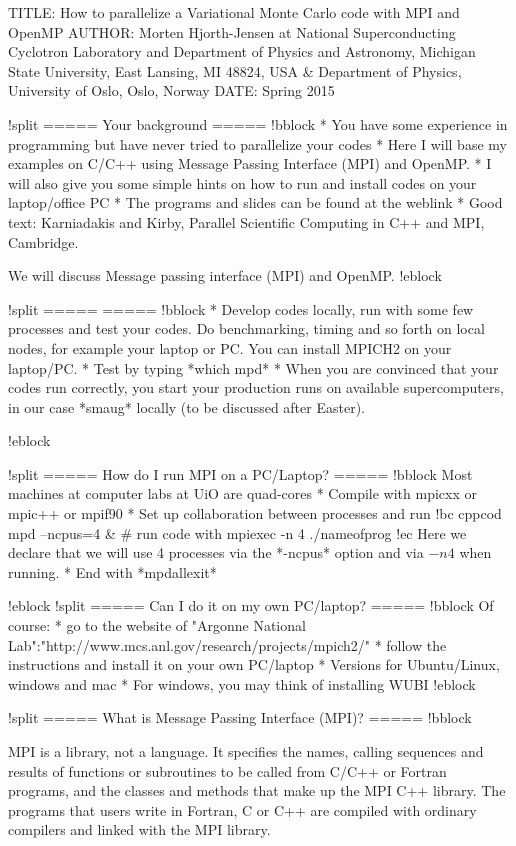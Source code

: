 TITLE: How to parallelize a Variational Monte Carlo code with MPI and OpenMP
AUTHOR: Morten Hjorth-Jensen at  National Superconducting Cyclotron Laboratory and Department of Physics and Astronomy, Michigan State University, East Lansing, MI 48824, USA & Department of Physics, University of Oslo, Oslo, Norway
DATE: Spring 2015


!split
===== Your background  =====
!bblock
* You have some experience in programming but have never tried to parallelize your codes
* Here I will base my examples on C/C++ using Message Passing Interface (MPI) and OpenMP. 
* I will also give you some simple hints on how to run and install codes on your laptop/office PC
* The programs and slides can be found at the weblink
* Good text: Karniadakis and Kirby, Parallel Scientific Computing in C++ and MPI, Cambridge.

We will discuss Message passing interface (MPI) and OpenMP.
!eblock

!split
=====  =====
!bblock
* Develop codes locally, run with some few processes and test your codes.  Do benchmarking, timing and so forth on local nodes, for example your laptop or PC.  You can install MPICH2 on  your laptop/PC. 
* Test by typing *which mpd*
* When you are convinced that your codes run correctly, you start your production runs on available supercomputers, in our case *smaug* locally (to be discussed after Easter).

!eblock

!split
===== How do I run MPI on a PC/Laptop?  =====
!bblock
Most machines at computer labs at UiO are quad-cores
* Compile with mpicxx or mpic++ or mpif90
* Set up collaboration between processes and run 
!bc cppcod
mpd --ncpus=4 &
#  run code with
mpiexec -n 4 ./nameofprog
!ec
Here we declare that we will use 4 processes via the *-ncpus* option and via $-n 4$ when running.
* End with *mpdallexit*

!eblock
!split
===== Can I do it on my own PC/laptop? =====
!bblock
Of course:
* go to the website of "Argonne National Lab":"http://www.mcs.anl.gov/research/projects/mpich2/"
* follow the instructions and install it on your own PC/laptop
* Versions for Ubuntu/Linux, windows and mac
* For windows, you may think of installing WUBI
!eblock

!split
===== What is Message Passing Interface (MPI)?  =====
!bblock

MPI is a library, not a language. It specifies the names, calling sequences and results of functions
or subroutines to be called from C/C++ or Fortran programs, and the classes and methods that make up the MPI C++
library. The programs that users write in Fortran, C or C++ are compiled with ordinary compilers and linked
with the MPI library.

